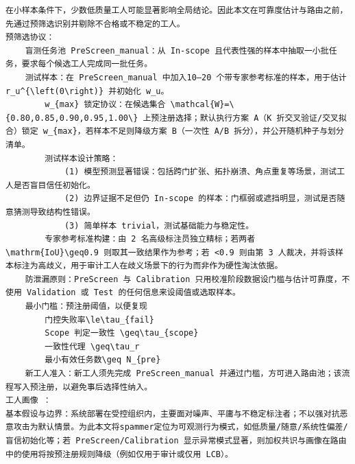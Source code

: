 \documentclass[a4paper,12pt]{article}
\begin{document}
\begin{Verbatim}[fontsize=\small,breaklines=true,breakanywhere=true]
在小样本条件下，少数低质量工人可能显著影响全局结论。因此本文在可靠度估计与路由之前，先通过预筛选识别并剔除不合格或不稳定的工人。
预筛选协议：
	盲测任务池 PreScreen_manual：从 In-scope 且代表性强的样本中抽取一小批任务，要求每个候选工人完成同一批任务。
	测试样本：在 PreScreen_manual 中加入10–20 个带专家参考标准的样本，用于估计r_u^{\left(0\right)} 并初始化 w_u。
		w_{max} 锁定协议：在候选集合 \mathcal{W}=\{0.80,0.85,0.90,0.95,1.00\} 上预注册选择；默认执行方案 A（K 折交叉验证/交叉拟合）锁定 w_{max}，若样本不足则降级方案 B（一次性 A/B 拆分），并公开随机种子与划分清单。
		测试样本设计策略：
			(1) 模型预测显著错误：包括跨门扩张、拓扑崩溃、角点重复等场景，测试工人是否盲目信任初始化。
			(2) 边界证据不足但仍 In-scope 的样本：门框弱或遮挡明显，测试是否随意猜测导致结构性错误。
			(3) 简单样本 trivial，测试基础能力与稳定性。
		专家参考标准构建：由 2 名高级标注员独立精标；若两者 \mathrm{IoU}\geq0.9 则取其一致结果作为参考；若 <0.9 则由第 3 人裁决，并将该样本标注为高歧义，用于审计工人在歧义场景下的行为而非作为硬性淘汰依据。
	防泄漏原则：PreScreen 与 Calibration 只用校准阶段数据设门槛与估计可靠度，不使用 Validation 或 Test 的任何信息来设阈值或选取样本。
	最小门槛：预注册阈值，以便复现
		门控失败率\le\tau_{fail}
		Scope 判定一致性 \geq\tau_{scope}
		一致性代理 \geq\tau_r
		最小有效任务数\geq N_{pre}
	新工人准入：新工人须先完成 PreScreen_manual 并通过门槛，方可进入路由池；该流程写入预注册，以避免事后选择性纳入。
工人画像 ：
基本假设与边界：系统部署在受控组织内，主要面对噪声、平庸与不稳定标注者；不以强对抗恶意攻击为默认情景。为此本文将spammer定位为可观测行为模式，如低质量/随意/系统性偏差/盲信初始化等；若 PreScreen/Calibration 显示异常模式显著，则加权共识与画像在路由中的使用将按预注册规则降级（例如仅用于审计或仅用 LCB）。


\end{Verbatim}
\end{document}
